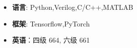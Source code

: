   \begin{itemize}[leftmargin=*]
    \item \textbf{语言}: Python,Verilog,C/C++,MATLAB
    \item \textbf{框架}: Tensorflow,PyTorch
    \item \textbf{英语}：四级 664, 六级 661
  \end{itemize}
